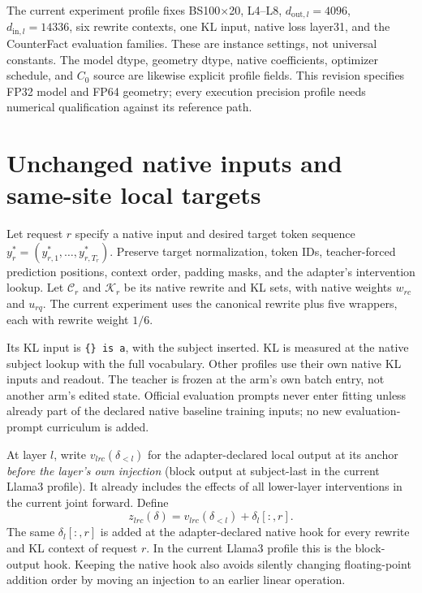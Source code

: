 \documentclass[11pt]{article}
\begin{document}
The current experiment profile fixes BS100$\times$20, L4--L8,
$d_{\mathrm{out},l}=4096$, $d_{\mathrm{in},l}=14336$, six rewrite contexts,
one KL input, native loss layer31, and the CounterFact evaluation families.
These are instance settings, not universal constants. The model dtype,
geometry dtype, native coefficients, optimizer schedule, and $C_0$ source
are likewise explicit profile fields. This revision specifies FP32 model
and FP64 geometry; every execution precision profile needs numerical
qualification against its reference path.

\section{Unchanged native inputs and same-site local targets}

Let request $r$ specify a native input and desired target token sequence
$y_r^*=(y_{r,1}^*,\ldots,y_{r,T_r}^*)$. Preserve target normalization,
token IDs, teacher-forced prediction positions, context order, padding
masks, and the adapter's intervention lookup. Let $\mathcal C_r$ and
$\mathcal K_r$ be its native rewrite and KL sets, with native weights
$w_{rc}$ and $u_{rq}$. The current experiment uses the canonical rewrite
plus five wrappers, each with rewrite weight $1/6$.

Its KL input is \texttt{\{\} is a}, with the subject inserted. KL is measured
at the native subject lookup with the full vocabulary. Other profiles use
their own native KL inputs and readout. The teacher is frozen at the arm's
own batch entry, not another arm's edited state. Official evaluation
prompts never enter fitting unless already part of the declared native
baseline training inputs; no new evaluation-prompt curriculum is added.

At layer $l$, write
$v_{lrc}(\delta_{<l})$ for the adapter-declared local output at its anchor
\emph{before the layer's own injection} (block output at subject-last in
the current Llama3 profile). It already includes the effects
of all lower-layer interventions in the current joint forward. Define
\begin{equation}
 z_{lrc}(\delta)
 =v_{lrc}(\delta_{<l})+\delta_l[:,r].
 \label{eq:local-target}
\end{equation}
The same $\delta_l[:,r]$ is added at the adapter-declared native hook for
every rewrite and KL context of request $r$. In the current Llama3 profile
this is the block-output hook. Keeping the native hook also avoids silently
changing floating-point addition order by moving an injection to an
earlier linear operation.
\end{document}
